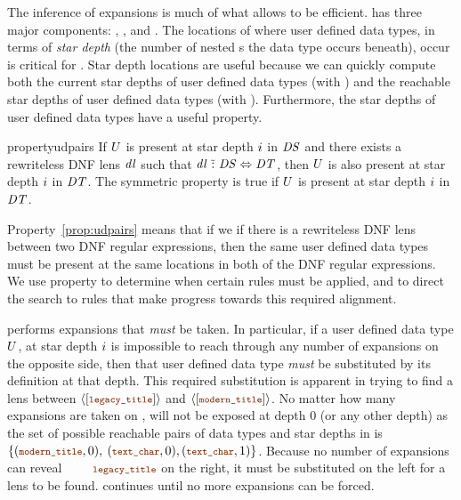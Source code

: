 \documentclass[acmsmall]{acmart}
\begin{document}
The inference of expansions is much of what allows \Optician{} to be
efficient.  \Expand{} has three major components: \ExpandRequired{}, \FixProblemElts{}, and
\ExpandOnce{}.  The locations of where user defined data types, in terms of
\emph{star depth} (the number of nested \Star{}s the data type occurs beneath),
occur is critical for \Expand{}.
Star depth locations are useful because we can quickly compute both the
current star depths of user defined data types (with \GetCurrentSet{}) and the
reachable star depths of user defined data types (with \GetTransitiveSet{}).
Furthermore, the star depths of user defined data types have a useful property.

\begin{restatable}{property}{udpairs}
  \label{prop:udpairs}
  If $U$ is present at star depth $i$ in $\mathit{DS}$ and there
  exists a rewriteless
  DNF lens $\mathit{dl}$ such that $\mathit{dl} \,\,\tilde{:}\,\, \mathit{DS}
  \Leftrightarrow \mathit{DT}$, then $U$ is also present at star depth
  $i$ in $\mathit{DT}$.  The symmetric property is true if $U$ is
  present at star depth $i$ in $\mathit{DT}$.
\end{restatable}

Property~\ref{prop:udpairs} means that if we if there is a rewriteless DNF lens
between two DNF regular expressions, then the same user defined
data types must be present at the same locations in both of the DNF regular
expressions. We use
property to determine when certain rules must be applied, and to direct the search
to rules that make progress towards this required alignment.

\ExpandRequired{} performs expansions that \emph{must} be taken.  In particular,
if a user defined data type $U$, at star depth $i$ is impossible 
to reach through any number of expansions on the opposite side, then that user
defined data type \emph{must} be substituted by its definition at that depth.
This required substitution is apparent
in trying to find a lens between $\DNFOf{\SequenceOf{\LegacyTitle}}$ and
$\DNFOf{\SequenceOf{\ModernTitle}}$.  No matter how many expansions are taken on
,  will not be exposed at depth 0 (or
any other depth) as the set of possible reachable pairs of
data types and star depths in  is $\{(\ModernTitle,0),
$ $(\TextChar,0),(\TextChar,1)\}$.  Because no number of expansions can reveal
$\VarCF{\LegacyTitle}$ on the right, it must be substituted on the left for a
lens to be found. \ExpandRequired{} continues until no more expansions can be
forced. 
\end{document}
